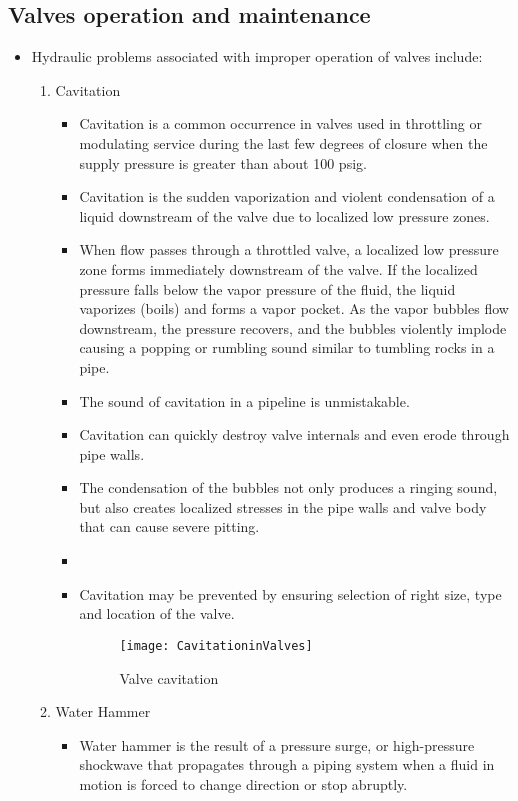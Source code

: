 \subsection{Valves operation and maintenance} 
\begin{itemize}
\item Hydraulic problems associated with improper operation of valves include:
\begin{enumerate}
\item Cavitation 
\begin{itemize}
\item Cavitation is a common occurrence in valves used in throttling or modulating service during the last few degrees of closure when the supply pressure is greater than about 100 psig. 
\item Cavitation is the sudden vaporization and violent condensation of a liquid downstream of the valve due to localized low pressure zones. 
\item When flow passes through a throttled valve, a localized low pressure zone forms immediately downstream of the valve. If the localized pressure falls below the vapor pressure of the fluid, the liquid vaporizes (boils) and forms a vapor pocket. As the vapor bubbles flow downstream, the pressure
recovers, and the bubbles violently implode causing a popping or rumbling sound similar to tumbling rocks in a pipe. 
\item The sound of cavitation in a pipeline is unmistakable. 
\item Cavitation can quickly destroy valve internals and even erode through pipe walls.
\item The condensation of the bubbles not only produces a ringing sound, but also creates localized stresses in the pipe walls and valve body that can cause severe pitting.
\item 
\item Cavitation may be prevented by ensuring selection of right size, type and location of the valve.
\begin{figure}[H]
\begin{center}
\texttt{[image: CavitationinValves]}
\caption{Valve cavitation}
\end{center}
\end{figure}
\end{itemize}
\item Water Hammer 
\begin{itemize}
\item Water hammer is the result of a pressure surge, or high-pressure shockwave that propagates through a piping system when a fluid in motion is forced to change direction or stop abruptly. 

\end{itemize}
\end{enumerate}
\end{itemize}
